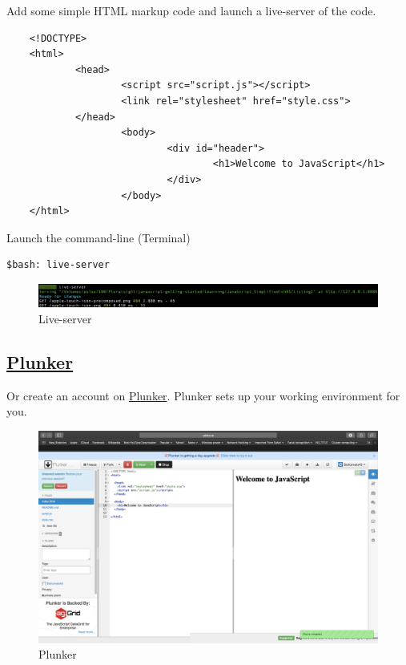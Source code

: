 \documentclass[10pt, a4paper, twocolumn]{article}
\begin{document}
Add some simple HTML markup code and launch a live-server of the code.

\begin{lstlisting}
	<!DOCTYPE>
	<html>
			<head>
					<script src="script.js"></script>
					<link rel="stylesheet" href="style.css">
			</head>
					<body>
							<div id="header">
									<h1>Welcome to JavaScript</h1>
							</div>
					</body>
	</html>
\end{lstlisting}

Launch the command-line (Terminal)

\begin{lstlisting}
$bash: live-server
\end{lstlisting}

\begin{figure}[h!]
	\includegraphics[width=\linewidth]{liveserver.png} %
	\caption{Live-server} %
	\label{ls} %
\end{figure}

\newpage
\subsection{\href{http://plnkr.co}{Plunker}}

Or create an account on  \href{http://plnkr.co/edit/?p=catalogue}{Plunker}.  Plunker sets up your working environment for you.

\begin{figure}[h!]
	\includegraphics[width=\linewidth]{plunker.png} %
	\caption{Plunker} %
	\label{plnkr} %
\end{figure}
\end{document}
